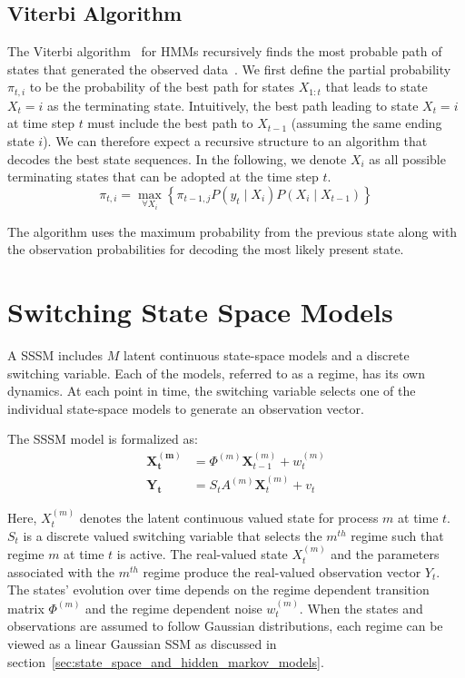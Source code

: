 \subsection{Viterbi Algorithm}\label{sec:viterbi_algorithm}
The Viterbi algorithm~\citep{forney1973viterbi} for HMMs recursively finds the most probable path of states that generated the observed data~\citep{nasrabadi2007pattern}. We first define the partial probability $\pi_{t,i}$ to be the probability of the best path for states $X_{1:t}$ that leads to state $X_t = i$ as the terminating state. Intuitively, the best path leading to state $X_t = i$ at time step $t$ must include the best path to $X_{t-1}$ (assuming the same ending state $i$). We can therefore expect a recursive structure to an algorithm that decodes the best state sequences. In the following, we denote $X_i$ as all possible terminating states that can be adopted at the time step $t$.
\begin{equation}\label{eq:viterbi}
  \pi_{t,i} = \max\limits_{\forall X_i} \left\{ \pi_{t-1,j} P(y_t \mid X_i)P(X_i \mid X_{t-1}) \right\}
\end{equation}

The algorithm uses the maximum probability from the previous state along with the observation probabilities for decoding the most likely present state.



\section{Switching State Space Models}\label{sec:switching_state_space_models}
A SSSM includes $M$ latent continuous state-space models and a discrete switching variable. Each of the models, referred to as a regime, has its own dynamics. At each point in time, the switching variable selects one of the individual state-space models to generate an observation vector.

The SSSM model is formalized as:
\begin{equation}
  \begin{split}
      \mathbf{X^{(m)}_t} &= \Phi^{(m)}\mathbf{X}^{(m)}_{t-1} + w^{(m)}_t \\
      \mathbf{Y_t} &= S_t A^{(m)}\mathbf{X}^{(m)}_t + v_t
  \end{split}\label{eq:switching_state_space}
\end{equation}

Here, $X_t^{(m)}$ denotes the latent continuous valued state for process $m$ at time $t$. $S_t$ is a discrete valued switching variable that selects the $m^{th}$ regime such that regime $m$ at time $t$ is active. The real-valued state $X_t^{(m)}$ and the parameters associated with the $m^{th}$ regime produce the real-valued observation vector $Y_t$. The states' evolution over time depends on the regime dependent transition matrix $\Phi^{(m)}$ and the regime dependent noise $w_t^{(m)}$. When the states and observations are assumed to follow Gaussian distributions, each regime can be viewed as a linear Gaussian SSM as discussed in section~\ref{sec:state_space_and_hidden_markov_models}.

